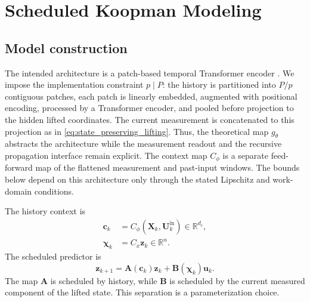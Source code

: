 \documentclass[journal]{IEEEtran}
\newcommand{\vu}{\mathbf{u}}
\newcommand{\vz}{\mathbf{z}}
\newcommand{\vc}{\mathbf{c}}
\newcommand{\vchi}{\boldsymbol{\chi}}
\newcommand{\mA}{\mathbf{A}}
\newcommand{\mB}{\mathbf{B}}
\newcommand{\mU}{\mathbf{U}}
\newcommand{\mX}{\mathbf{X}}
\newcommand{\R}{\mathbb{R}}
\begin{document}
\section{Scheduled Koopman Modeling}
\label{sec:model}

\subsection{Model construction}

The intended architecture is a patch-based temporal Transformer encoder \cite{vaswani2017attention,nie2023time}. We impose the implementation constraint $p\mid P$: the history is partitioned into $P/p$ contiguous patches, each patch is linearly embedded, augmented with positional encoding, processed by a Transformer encoder, and pooled before projection to the hidden lifted coordinates. The current measurement is concatenated to this projection as in \eqref{eq:state_preserving_lifting}. Thus, the theoretical map $g_\theta$ abstracts the architecture while the measurement readout and the recursive propagation interface remain explicit. The context map $C_\phi$ is a separate feed-forward map of the flattened measurement and past-input windows. The bounds below depend on this architecture only through the stated Lipschitz and work-domain conditions.

The history context is
\begin{align}
    \vc_k&=C_\phi(\mX_k,\mU_k^{\mathrm{in}})\in\R^{d_c},
    \label{eq:history_context}\\
    \vchi_k&=C_x\vz_k\in\R^n.
    \label{eq:scheduling_variables}
\end{align}
The scheduled predictor is
\begin{equation}
    \vz_{k+1}=\mA(\vc_k)\vz_k+\mB(\vchi_k)\vu_k.
    \label{eq:scheduled_predictor}
\end{equation}
The map $\mA$ is scheduled by history, while $\mB$ is scheduled by the current measured component of the lifted state. This separation is a parameterization choice.
\end{document}
